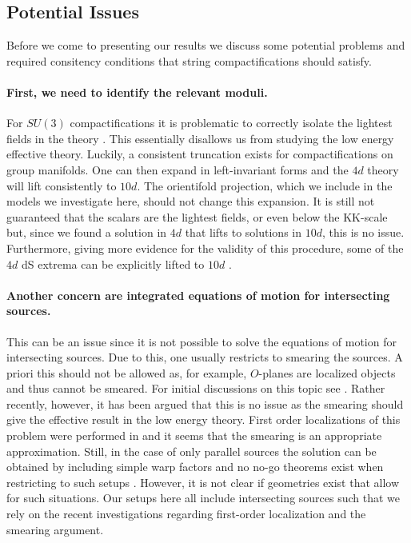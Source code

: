 \documentclass[a4paper,12pt,twoside,openright]{report}
\begin{document}
\subsection{Potential Issues}
\label{sec:stringrequ}
Before we come to presenting our results we discuss some potential problems and required consitency conditions that string compactifications should satisfy.
\paragraph{First, we need to identify the relevant moduli.} For $SU(3)$ compactifications it is problematic to correctly isolate the lightest fields in the theory \cite{Kashani-Poor:2006ofe,Kashani-Poor:2007nby}. This essentially disallows us from studying the low energy effective theory. Luckily, a consistent truncation exists \cite{Cassani:2009ck} for compactifications on group manifolds. One can then expand in left-invariant forms and the $4d$ theory will lift consistently to $10d$. The orientifold projection, which we include in the models we investigate here, should not change this expansion. It is still not guaranteed that the scalars are the lightest fields, or even below the KK-scale \cite{Andriot:2018wzk} but, since we found a solution in $4d$ that lifts to solutions in $10d$, this is no issue. Furthermore, giving more evidence for the validity of this procedure, some of the $4d$ dS extrema can be explicitly lifted to $10d$ \cite{Danielsson:2010bc}.
\paragraph{Another concern are integrated equations of motion for intersecting sources.} This can be an issue since it is not possible to solve the equations of motion for intersecting sources. Due to this, one usually restricts to smearing the sources. A priori this should not be allowed as, for example, $O$-planes are localized objects and thus cannot be smeared. For initial discussions on this topic see \cite{Douglas:2010rt,Blaback:2010sj,Blaback:2011nz,Blaback:2011pn,Saracco:2012wc,McOrist:2012yc}. Rather recently, however, it has been argued that this is no issue as the smearing should give the effective result in the low energy theory. First order localizations of this problem were performed in \cite{Baines:2020dmu,Junghans:2020acz,Marchesano:2020qvg,Cribiori:2021djm} and it seems that the smearing is an appropriate approximation. Still, in the case of only parallel sources the solution can be obtained by including simple warp factors and no no-go theorems exist when restricting to such setups \cite{Andriot:2016xvq}. However, it is not clear if geometries exist that allow for such situations. Our setups here all include intersecting sources such that we rely on the recent investigations regarding first-order localization and the smearing argument. 
\end{document}

